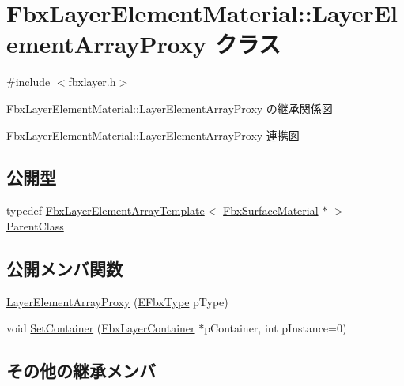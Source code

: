 \hypertarget{class_fbx_layer_element_material_1_1_layer_element_array_proxy}{}\section{Fbx\+Layer\+Element\+Material\+:\+:Layer\+Element\+Array\+Proxy クラス}
\label{class_fbx_layer_element_material_1_1_layer_element_array_proxy}


{\ttfamily \#include $<$fbxlayer.\+h$>$}



Fbx\+Layer\+Element\+Material\+:\+:Layer\+Element\+Array\+Proxy の継承関係図


Fbx\+Layer\+Element\+Material\+:\+:Layer\+Element\+Array\+Proxy 連携図
\subsection*{公開型}
\begin{DoxyCompactItemize}
\item 
typedef \hyperlink{class_fbx_layer_element_array_template}{Fbx\+Layer\+Element\+Array\+Template}$<$ \hyperlink{class_fbx_surface_material}{Fbx\+Surface\+Material} $\ast$ $>$ \hyperlink{class_fbx_layer_element_material_1_1_layer_element_array_proxy_a20356a1bce1797b2acfcd42ba5082dd8}{Parent\+Class}
\end{DoxyCompactItemize}
\subsection*{公開メンバ関数}
\begin{DoxyCompactItemize}
\item 
\hyperlink{class_fbx_layer_element_material_1_1_layer_element_array_proxy_a92c188964960704f5a2310b53a974109}{Layer\+Element\+Array\+Proxy} (\hyperlink{fbxpropertytypes_8h_a73913a5ddfb20e57c6f25e9e6784bd92}{E\+Fbx\+Type} p\+Type)
\item 
void \hyperlink{class_fbx_layer_element_material_1_1_layer_element_array_proxy_a8772c8cf8d76dbdcb5d4019ef29d6af0}{Set\+Container} (\hyperlink{class_fbx_layer_container}{Fbx\+Layer\+Container} $\ast$p\+Container, int p\+Instance=0)
\end{DoxyCompactItemize}
\subsection*{その他の継承メンバ}


